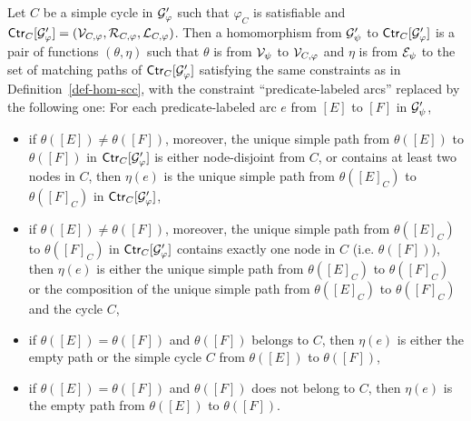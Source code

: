\documentclass{llncs}
\begin{document}
 \vspace{-2mm}
\begin{definition}\label{def-hom-cycle}
Let $C$ be a simple cycle in $\mathcal{G}'_\varphi$ such that $\varphi_C$ is satisfiable and ${\sf Ctr}_C[\mathcal{G}'_\varphi] = (\mathcal{V}_{C,\varphi}, \mathcal{R}_{C,\varphi}, \mathcal{L}_{C,\varphi})$. Then a homomorphism from $\mathcal{G}'_\psi$  to ${\sf Ctr}_C[\mathcal{G}'_\varphi]$ is a pair of functions $(\theta,\eta)$ such that $\theta$ is from $\mathcal{V}_\psi$ to $\mathcal{V}_{C,\varphi}$ and $\eta$ is from $\mathcal{E}_\psi$ to the set of matching paths of ${\sf Ctr}_C[\mathcal{G}'_\varphi]$ satisfying the same constraints as in Definition~\ref{def-hom-scc}, with the constraint ``predicate-labeled arcs'' replaced by
the following one: For each predicate-labeled arc $e$ from $[E]$ to $[F]$ in $\mathcal{G}'_{\psi}$,
\begin{itemize}
\item if $\theta([E]) \neq \theta([F])$, moreover, the unique simple path from $\theta([E])$ to $\theta([F])$ in ${\sf Ctr}_C[\mathcal{G}'_\varphi]$ is either node-disjoint from $C$, or contains at least two nodes in $C$, then $\eta(e)$ is the unique simple path from $\theta([E]_C)$ to $\theta([F]_C)$ in ${\sf Ctr}_C[\mathcal{G}'_\varphi]$,
%
%

\item if $\theta([E]) \neq \theta([F])$, moreover,  the unique simple path from $\theta([E]_C)$ to $\theta([F]_C)$ in ${\sf Ctr}_C[\mathcal{G}'_\varphi]$ contains exactly one node in $C$ (i.e. $\theta([F])$), then $\eta(e)$ is either the unique simple path from $\theta([E]_C)$ to $\theta([F]_C)$ or the composition of the unique simple path from $\theta([E]_C)$ to $\theta([F]_C)$ and the cycle $C$,
%
\item if $\theta([E]) = \theta([F])$ and $\theta([F])$ belongs to $C$, then $\eta(e)$ is either the empty path or the simple cycle $C$ from $\theta([E])$ to $\theta([F])$,
%
\item if $\theta([E]) = \theta([F])$ and $\theta([F])$ does not belong to $C$, then $\eta(e)$ is the empty path from $\theta([E])$ to $\theta([F])$.
\end{itemize}
\vspace{-2mm}
\end{definition}
\end{document}

